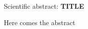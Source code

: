 \documentclass[11pt,a4paper]{article}
\begin{document}


Scientific abstract: \textbf{TITLE}

\bigskip

Here comes the abstract 
\end{document}
